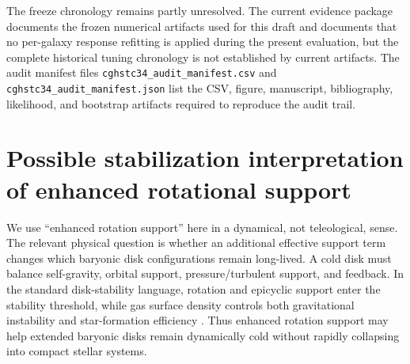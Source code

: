 \documentclass[aps,prd,preprint,nofootinbib,superscriptaddress]{revtex4-2}
\providecommand{\FloatBarrier}{\clearpage}
\begin{document}
The freeze chronology remains partly unresolved. The current evidence package documents the frozen numerical artifacts used for this draft and documents that no per-galaxy response refitting is applied during the present evaluation, but the complete historical tuning chronology is not established by current artifacts. The audit manifest files \texttt{cghstc34\_audit\_manifest.csv} and \texttt{cghstc34\_audit\_manifest.json} list the CSV, figure, manuscript, bibliography, likelihood, and bootstrap artifacts required to reproduce the audit trail.

\begin{table}[t]
\centering
\scriptsize
\caption{Freeze-chronology status for the current evidence package.}
\label{tab:freeze-chronology}
\end{table}


\clearpage
\FloatBarrier
\section{Possible stabilization interpretation of enhanced rotational support}

We use ``enhanced rotation support'' here in a dynamical, not teleological, sense. The relevant physical question is whether an additional effective support term changes which baryonic disk configurations remain long-lived. A cold disk must balance self-gravity, orbital support, pressure/turbulent support, and feedback. In the standard disk-stability language, rotation and epicyclic support enter the stability threshold, while gas surface density controls both gravitational instability and star-formation efficiency \cite{Toomre1964,Kennicutt1998,Bigiel2008,Leroy2008,RomeoMogotsi2017}. Thus enhanced rotation support may help extended baryonic disks remain dynamically cold without rapidly collapsing into compact stellar systems.
\end{document}
